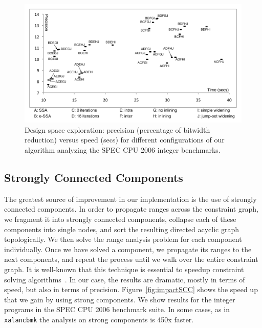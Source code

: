 \documentclass{paper}
\begin{document}
\begin{figure}[t!]
\begin{center}
\includegraphics[width=\textwidth]{images/space}
\end{center}
\caption{\label{fig:space}
Design space exploration: precision (percentage of bitwidth reduction)
versus speed (secs) for different configurations of our algorithm analyzing
the SPEC CPU 2006 integer benchmarks.}
\end{figure}

\subsection{Strongly Connected Components}
\label{sub:sccs}

The greatest source of improvement in our implementation is the use of strongly
connected components.
In order to propagate ranges across the constraint graph, we fragment it
into strongly connected components, collapse each of these components into
single nodes, and sort the resulting directed acyclic graph topologically.
We then solve the range analysis problem for each component individually.
Once we have solved a component, we propagate its ranges to the next
components, and repeat the process until we walk over the entire constraint
graph.
It is well-known that this technique is essential to speedup constraint solving
algorithms~\cite[Sec 6.3]{Nielson99}.
In our case, the results are dramatic, mostly in terms of speed, but also in
terms of precision.
Figure~\ref{fig:impactSCC} shows the speed up that we gain by using strong
components.
We show results for the integer programs in the SPEC CPU 2006 benchmark suite.
In some cases, as in \texttt{xalancbmk} the analysis on strong components is
450x faster.
\end{document}
